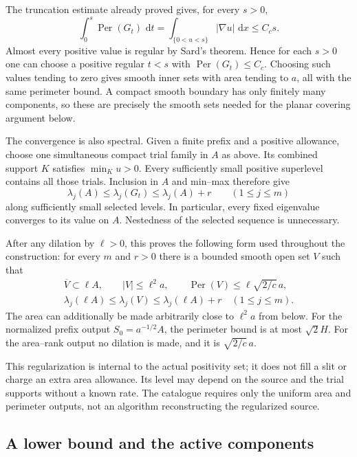 \documentclass[11pt,reqno]{amsart}
\numberwithin{equation}{section}
\newcommand{\dd}{\,\mathrm d}
\newcommand{\abs}[1]{\lvert#1\rvert}
\begin{document}
The truncation estimate already proved gives, for every \(s>0\),
\[
 \int_0^s\operatorname{Per}(G_t)\,\dd t
 =\int_{\{0<u<s\}}\abs{\nabla u}\,\dd x
 \le C_cs.
\]
Almost every positive value is regular by Sard's theorem.  Hence for
each \(s>0\) one can choose a positive regular \(t<s\) with
\(\operatorname{Per}(G_t)\le C_c\).  Choosing such values tending
to zero gives smooth inner sets with area tending to \(a\), all
with the same perimeter bound.  A compact smooth boundary has only
finitely many components, so these are precisely the smooth sets
needed for the planar covering argument below.

The convergence is also spectral.  Given a finite prefix and a
positive allowance, choose one simultaneous compact trial family
in \(A\) as above.  Its combined support \(K\) satisfies
\(\min_Ku>0\).  Every sufficiently small positive superlevel
contains all those trials.  Inclusion in \(A\) and min--max
therefore give
\[
 \lambda_j(A)\le\lambda_j(G_t)\le\lambda_j(A)+r
 \qquad(1\le j\le m)
\]
along sufficiently small selected levels.  In particular, every
fixed eigenvalue converges to its value on \(A\).  Nestedness of
the selected sequence is unnecessary.

After any dilation by \(\ell>0\), this proves the following form
used throughout the construction: for every \(m\) and \(r>0\)
there is a bounded smooth open set \(V\) such that
\begin{equation}
 \begin{gathered}
 \overline V\subset\ell A,\qquad
 \abs V\le\ell^2a,\qquad
 \operatorname{Per}(V)\le\ell\sqrt{2/c}\,a,\\
 \lambda_j(\ell A)\le\lambda_j(V)
           \le\lambda_j(\ell A)+r\quad(1\le j\le m).
 \end{gathered}
 \label{surgery:bv}
\end{equation}
The area can additionally be made arbitrarily close to
\(\ell^2a\) from below.  For the normalized prefix output
\(S_0=a^{-1/2}A\), the perimeter bound is at most \(\sqrt2H\).
For the area--rank output no dilation is made, and it is
\(\sqrt{2/c}\,a\).

This regularization is internal to the actual positivity set; it
does not fill a slit or charge an extra area allowance.  Its level
may depend on the source and the trial supports without a known
rate.  The catalogue requires only the uniform area and perimeter
outputs, not an algorithm reconstructing the regularized source.

\subsection{A lower bound and the active components}
\label{grid:active-section}
\end{document}
